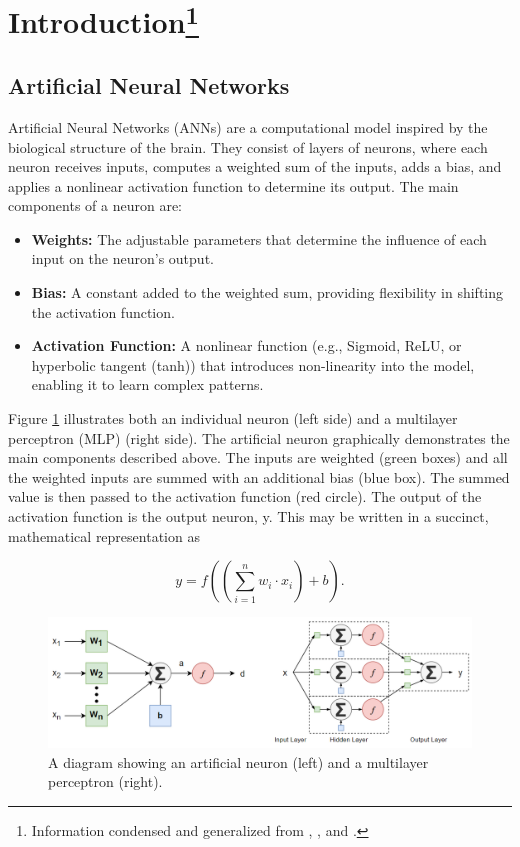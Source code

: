 \documentclass[11pt,pdftex,portrait,letterpaper]{article}
\begin{document}
\section[Introduction]{Introduction\footnote{Information condensed and generalized from \cite{qiao2024artificial}, \cite{engelbrecht2007computational}, and \cite{bishop2006pattern}.}}
\subsection{Artificial Neural Networks}
Artificial Neural Networks (ANNs) are a computational model inspired by the biological structure of the brain. They consist of layers of neurons, where each neuron receives inputs, computes a weighted sum of the inputs, adds a bias, and applies a nonlinear activation function to determine its output. The main components of a neuron are:
\begin{itemize}
    \item \textbf{Weights:} The adjustable parameters that determine the influence of each input on the neuron's output.
    \item \textbf{Bias:} A constant added to the weighted sum, providing flexibility in shifting the activation function.
    \item \textbf{Activation Function:} A nonlinear function (e.g., Sigmoid, ReLU, or hyperbolic tangent (tanh)) that introduces non-linearity into the model, enabling it to learn complex patterns.
\end{itemize}

Figure \ref{fig:neuron_mlp} illustrates both an individual neuron (left side) and a multilayer perceptron (MLP) (right side). The artificial neuron graphically demonstrates the main components described above. The inputs are weighted (green boxes) and all the weighted inputs are summed with an additional bias (blue box). The summed value is then passed to the activation function (red circle). The output of the activation function is the output neuron, y. This may be written in a succinct, mathematical representation as

\begin{equation} \label{eq:neuron}
    y = f\left(\left(\sum_{i=1}^{n} w_i \cdot x_i\right) + b\right).
\end{equation}

\begin{figure}[h]
    \centering
    \includegraphics[width=\textwidth]{./figures/neuron_and_mlp}
    \caption{A diagram showing an artificial neuron (left) and a multilayer perceptron (right).}
    \label{fig:neuron_mlp}
\end{figure}
\end{document}
